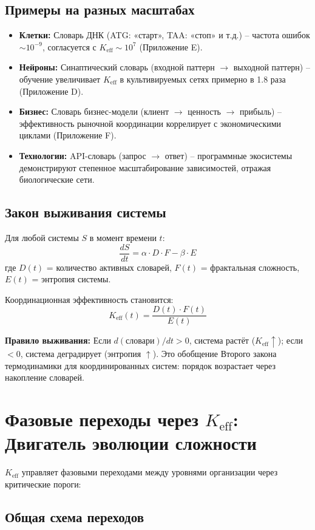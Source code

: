 \documentclass[12pt,a4paper]{article}
\newcommand{\eff}{\mathrm{eff}}
\newcommand{\Ke}{K_{\eff}}
\begin{document}
	\subsection{Примеры на разных масштабах}
	
	\begin{itemize}
		\item \textbf{Клетки:} Словарь ДНК (ATG: «старт», TAA: «стоп» и т.д.) – частота ошибок $\sim 10^{-9}$, согласуется с $\Ke \sim 10^7$ (Приложение E).
		\item \textbf{Нейроны:} Синаптический словарь (входной паттерн $\to$ выходной паттерн) – обучение увеличивает $\Ke$ в культивируемых сетях примерно в 1.8 раза (Приложение D).
		\item \textbf{Бизнес:} Словарь бизнес-модели (клиент $\to$ ценность $\to$ прибыль) – эффективность рыночной координации коррелирует с экономическими циклами (Приложение F).
		\item \textbf{Технологии:} API-словарь (запрос $\to$ ответ) – программные экосистемы демонстрируют степенное масштабирование зависимостей, отражая биологические сети.
	\end{itemize}
	
	\subsection{Закон выживания системы}
	
	Для любой системы $S$ в момент времени $t$:
	\[
	\frac{dS}{dt} = \alpha \cdot D \cdot F - \beta \cdot E
	\]
	где $D(t)$ = количество активных словарей, $F(t)$ = фрактальная сложность, $E(t)$ = энтропия системы.
	
	Координационная эффективность становится:
	\[
	\Ke(t) = \frac{D(t) \cdot F(t)}{E(t)}
	\]
	
	\textbf{Правило выживания:} Если $d(\text{словари})/dt > 0$, система растёт ($\Ke \uparrow$); если $< 0$, система деградирует (энтропия $\uparrow$). Это обобщение Второго закона термодинамики для координированных систем: порядок возрастает через накопление словарей.
	
	\section{Фазовые переходы через $\Ke$: Двигатель эволюции сложности}
	
	$\Ke$ управляет фазовыми переходами между уровнями организации через критические пороги:
	
	\subsection{Общая схема переходов}
	
\end{document}
